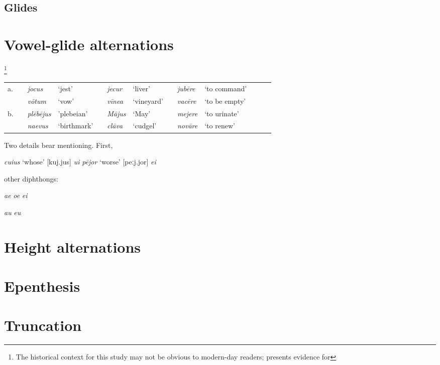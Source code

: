 \subsection{Glides}

\section{Vowel-glide alternations}

\citet{Hill1954}
\footnote{The historical context for this study may not be obvious to modern-day readers; \citeauthor{Hill1954} presents evidence for}

\citet{Steriade1984}

\begin{example}
\vspace{\baselineskip}
\begin{tabular}{l c ll c ll c ll c ll}
a. && \emph{jocus}    & `jest'      && \emph{jecur}  & `liver'     && \emph{jubēre} & `to command' \\
   && \emph{vōtum}    & `vow'       && \emph{vīnea}  & `vineyard'  && \emph{vacēre} & `to be empty' \\
b. && \emph{plēbējus} & 'plebeian'  && \emph{Mājus}  & `May'       && \emph{mejere} & `to urinate' \\
   && \emph{naevus}   & `birthmark' && \emph{clāva}  & `cudgel'    && \emph{novāre} & `to renew' \\
\end{tabular}
\end{example}

Two details bear mentioning. First, 

\emph{cuius} `whose'
[kuj.jus]
\emph{ui}
\emph{pējor} `worse' 
[peːj.jor]
\emph{ei}

other diphthongs:

\emph{ae}
\emph{oe}
\emph{ei}

\emph{au}
\emph{eu}

\citet{Devine1977}

\section{Height alternations}

\section{Epenthesis}

\section{Truncation}
